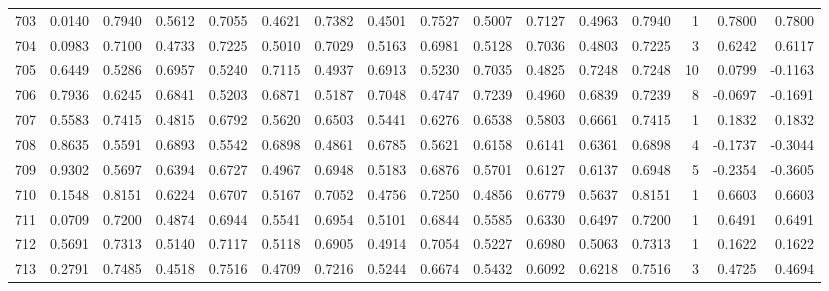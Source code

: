 \begin{tabular}{lrrrrrrrrrrrrrrr}
703 &      0.0140 &  0.7940 &  0.5612 &  0.7055 &  0.4621 &  0.7382 &  0.4501 &  0.7527 &  0.5007 &  0.7127 &   0.4963 &     0.7940 &      1 &                    0.7800 &                     0.7800 \\
704 &      0.0983 &  0.7100 &  0.4733 &  0.7225 &  0.5010 &  0.7029 &  0.5163 &  0.6981 &  0.5128 &  0.7036 &   0.4803 &     0.7225 &      3 &                    0.6242 &                     0.6117 \\
705 &      0.6449 &  0.5286 &  0.6957 &  0.5240 &  0.7115 &  0.4937 &  0.6913 &  0.5230 &  0.7035 &  0.4825 &   0.7248 &     0.7248 &     10 &                    0.0799 &                    -0.1163 \\
706 &      0.7936 &  0.6245 &  0.6841 &  0.5203 &  0.6871 &  0.5187 &  0.7048 &  0.4747 &  0.7239 &  0.4960 &   0.6839 &     0.7239 &      8 &                   -0.0697 &                    -0.1691 \\
707 &      0.5583 &  0.7415 &  0.4815 &  0.6792 &  0.5620 &  0.6503 &  0.5441 &  0.6276 &  0.6538 &  0.5803 &   0.6661 &     0.7415 &      1 &                    0.1832 &                     0.1832 \\
708 &      0.8635 &  0.5591 &  0.6893 &  0.5542 &  0.6898 &  0.4861 &  0.6785 &  0.5621 &  0.6158 &  0.6141 &   0.6361 &     0.6898 &      4 &                   -0.1737 &                    -0.3044 \\
709 &      0.9302 &  0.5697 &  0.6394 &  0.6727 &  0.4967 &  0.6948 &  0.5183 &  0.6876 &  0.5701 &  0.6127 &   0.6137 &     0.6948 &      5 &                   -0.2354 &                    -0.3605 \\
710 &      0.1548 &  0.8151 &  0.6224 &  0.6707 &  0.5167 &  0.7052 &  0.4756 &  0.7250 &  0.4856 &  0.6779 &   0.5637 &     0.8151 &      1 &                    0.6603 &                     0.6603 \\
711 &      0.0709 &  0.7200 &  0.4874 &  0.6944 &  0.5541 &  0.6954 &  0.5101 &  0.6844 &  0.5585 &  0.6330 &   0.6497 &     0.7200 &      1 &                    0.6491 &                     0.6491 \\
712 &      0.5691 &  0.7313 &  0.5140 &  0.7117 &  0.5118 &  0.6905 &  0.4914 &  0.7054 &  0.5227 &  0.6980 &   0.5063 &     0.7313 &      1 &                    0.1622 &                     0.1622 \\
713 &      0.2791 &  0.7485 &  0.4518 &  0.7516 &  0.4709 &  0.7216 &  0.5244 &  0.6674 &  0.5432 &  0.6092 &   0.6218 &     0.7516 &      3 &                    0.4725 &                     0.4694 \\

\end{tabular}
